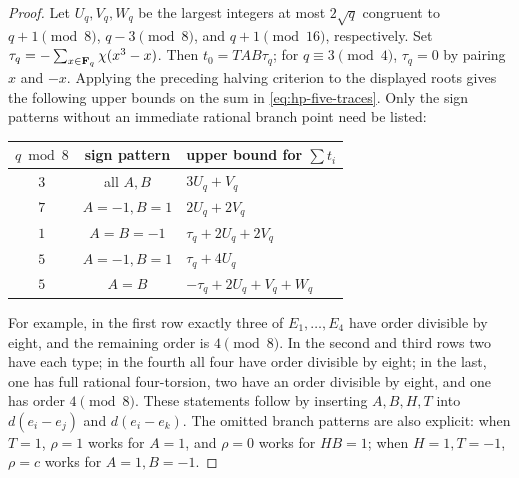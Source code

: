 \begin{proof}
Let $U_q,V_q,W_q$ be the largest integers at most $2\sqrt q$
congruent to $q+1\pmod8$, $q-3\pmod8$, and $q+1\pmod {16}$,
respectively.  Set
$\tau_q=-\sum_{x\in\mathbf F_q}\chi(x^3-x)$.
Then $t_0=TAB\tau_q$; for $q\equiv3\pmod4$, $\tau_q=0$ by
pairing $x$ and $-x$.
Applying the preceding halving criterion to the displayed roots gives
the following upper bounds on the sum in \eqref{eq:hp-five-traces}.
Only the sign patterns without an immediate rational branch point
need be listed:
\begin{center}
\begin{tabular}{ccl}
\toprule
$q\bmod8$&sign pattern&upper bound for $\sum t_i$\\
\midrule
$3$&all $A,B$&$3U_q+V_q$\\
$7$&$A=-1,B=1$&$2U_q+2V_q$\\
$1$&$A=B=-1$&$\tau_q+2U_q+2V_q$\\
$5$&$A=-1,B=1$&$\tau_q+4U_q$\\
$5$&$A=B$&$-\tau_q+2U_q+V_q+W_q$\\
\bottomrule
\end{tabular}
\end{center}
For example, in the first row exactly three of $E_1,\ldots,E_4$ have
order divisible by eight, and the remaining order is $4\pmod8$.
In the second and third rows two have each type; in the fourth all
four have order divisible by eight; in the last, one has full rational
four-torsion, two have an order divisible by eight, and one has order
$4\pmod8$.  These statements follow by inserting $A,B,H,T$ into
$d(e_i-e_j)$ and $d(e_i-e_k)$.
The omitted branch patterns are also explicit: when $T=1$, $\rho=1$
works for $A=1$, and $\rho=0$ works for $HB=1$; when $H=1,T=-1$,
$\rho=c$ works for $A=1,B=-1$.


\end{proof}

